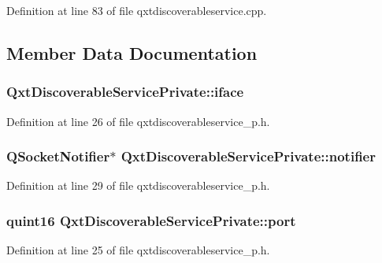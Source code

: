 Definition at line 83 of file qxtdiscoverableservice.\-cpp.



\subsection{Member Data Documentation}
\hypertarget{class_qxt_discoverable_service_private_a92e36c58936d8b75feaa535373760be5}{
\subsubsection[{iface}]{ Qxt\-Discoverable\-Service\-Private\-::iface}}\label{class_qxt_discoverable_service_private_a92e36c58936d8b75feaa535373760be5}


Definition at line 26 of file qxtdiscoverableservice\-\_\-p.\-h.

\hypertarget{class_qxt_discoverable_service_private_a4bdc2d5a33ecab1135b07893d01e044a}{
\subsubsection[{notifier}]{\setlength{\rightskip}{0pt plus 5cm}Q\-Socket\-Notifier$\ast$ Qxt\-Discoverable\-Service\-Private\-::notifier}}\label{class_qxt_discoverable_service_private_a4bdc2d5a33ecab1135b07893d01e044a}


Definition at line 29 of file qxtdiscoverableservice\-\_\-p.\-h.

\hypertarget{class_qxt_discoverable_service_private_a49fda9c17c9e5430046c0e88746a2058}{
\subsubsection[{port}]{\setlength{\rightskip}{0pt plus 5cm}quint16 Qxt\-Discoverable\-Service\-Private\-::port}}\label{class_qxt_discoverable_service_private_a49fda9c17c9e5430046c0e88746a2058}


Definition at line 25 of file qxtdiscoverableservice\-\_\-p.\-h.


